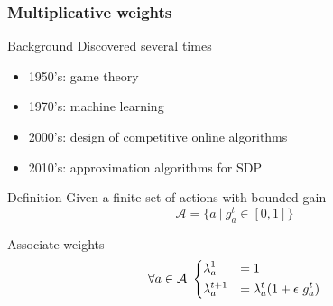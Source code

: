 \documentclass{beamer}
\begin{document}
\begin{frame}
    \frametitle{Multiplicative weights}

    \begin{block}{Background}
        Discovered several times
        \begin{itemize}
            \item 1950's: game theory
            \item 1970's: machine learning
            \item 2000's: design of competitive online algorithms
            \item 2010's: approximation algorithms for SDP
        \end{itemize}
    \end{block}
    \begin{block}{Definition}
        Given a finite set of actions with bounded gain
        \begin{equation*}
            \mathcal{A} = \{ a~|~g_a^t \in [0, 1]  \}
        \end{equation*}

        Associate weights 
        \begin{equation*}
        \forall a\in\mathcal{A}~
        \begin{dcases}
            \lambda_a^{1} &= 1\\
            \lambda_a^{t+1} &= \lambda_a^t (1 + \epsilon~g_a^t)
        \end{dcases}
        \end{equation*}
    \end{block}

\end{frame}
\end{document}
